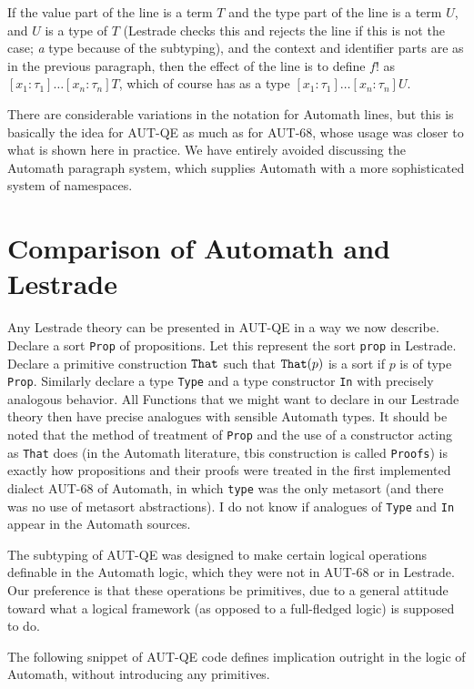 \documentclass{article}
\begin{document}
If the value part of the line is a term $T$ and the type part of the line is a term $U$, and $U$ is a type of $T$ (Lestrade checks this and rejects the line if this is not the case; {\em a\/} type because of the subtyping), and the context and identifier parts are as in the previous paragraph,  then the effect of the line is to define $f!$ as $[x_1:\tau_1]\ldots[x_n:\tau_n]T$, which of course has as a type $[x_1:\tau_1]\ldots[x_n:\tau_n]U$.

There are considerable variations in the notation for Automath lines, but this is basically the idea for AUT-QE as much as for AUT-68, whose usage was closer to what is shown here in practice.  We have entirely avoided discussing the Automath paragraph system, which supplies Automath with a more sophisticated system of namespaces.

\section{Comparison of Automath and Lestrade}

Any Lestrade theory can be presented in AUT-QE in a way we now describe.  Declare a sort {\tt Prop} of propositions.  Let this represent the
sort {\tt prop} in Lestrade.  Declare a primitive construction ${\tt That}$ such that ${\tt That}(p)$ is a sort if $p$ is of type {\tt Prop}.
Similarly declare a type {\tt Type} and a type constructor {\tt In} with precisely analogous behavior.  All Functions that we might want to declare
in our Lestrade theory then have precise analogues with sensible Automath types.  It should be noted that the method of treatment of {\tt Prop}
and the use of a constructor acting as {\tt That} does (in the Automath literature, tbis construction is called {\tt Proofs}) is exactly how propositions
and their proofs were treated in the first implemented dialect AUT-68 of Automath, in which {\tt type} was the only metasort (and there was no use
of metasort abstractions).  I do not know if analogues of {\tt Type} and {\tt In} appear in the Automath sources.

The subtyping of AUT-QE was designed to make certain logical operations definable in the Automath logic, which they were not in AUT-68 or in Lestrade.
Our preference is that these operations be primitives, due to a general attitude toward what a logical framework (as opposed to a full-fledged logic) is supposed to do.

The following snippet of AUT-QE code defines implication outright in the logic of Automath, without introducing any primitives.
\end{document}
